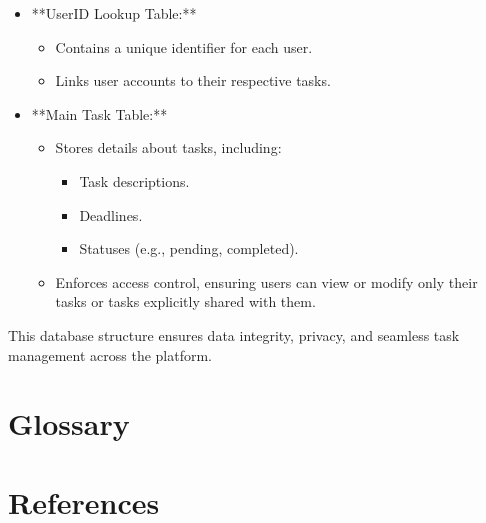 \documentclass{article}
\begin{document}
\begin{itemize}
    \item **UserID Lookup Table:**
    \begin{itemize}
        \item Contains a unique identifier for each user.
        \item Links user accounts to their respective tasks.
    \end{itemize}
    \item **Main Task Table:**
    \begin{itemize}
        \item Stores details about tasks, including:
        \begin{itemize}
            \item Task descriptions.
            \item Deadlines.
            \item Statuses (e.g., pending, completed).
        \end{itemize}
        \item Enforces access control, ensuring users can view or modify only their tasks or tasks explicitly shared with them.
    \end{itemize}
\end{itemize}

This database structure ensures data integrity, privacy, and seamless task management across the platform.

\pagebreak
\section{Glossary}
\printglossaries

\pagebreak
\section{References}
\printbibliography
\end{document}
